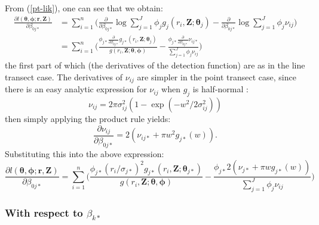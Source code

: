 \documentclass[10pt]{article}
\begin{document}
From (\ref{pt-lik}), one can see that we obtain:
\begin{align*}
\frac{\partial l(\boldsymbol{\theta}, \boldsymbol{\phi}; \mathbf{r},\mathbf{Z})}{\partial \beta_{0j*}}  &= \sum_{i=1}^n \Big( \frac{\partial}{\partial \beta_{0j*}} \log \sum_{j=1}^J \phi_j g_j(r_i,\mathbf{Z}; \boldsymbol{\theta}_j) - \frac{\partial}{\partial \beta_{0j*}}\log \sum_{j=1}^J \phi_j \nu_{ij}\Big)\\
&= \sum_{i=1}^n \Big( \frac{ \phi_{j*} \frac{\partial}{\partial \beta_{0j*}}  g_{j*} (r_i,\mathbf{Z}; \boldsymbol{\theta}_j)}{g(r_i,\mathbf{Z}; \boldsymbol{\theta}, \boldsymbol{\phi})} - \frac{ \phi_{j*}\frac{\partial}{\partial \beta_{0j*}}  \nu_{ij*} }{ \sum_{j=1}^J \phi_j \nu_{ij}}\Big)
\end{align*}
the first part of which (the derivatives of the detection function) are as in the line transect case. The derivatives of $\nu_{ij}$ are simpler in the point transect case, since there is an easy analytic expression for $\nu_{ij}$ when $g_j$ is half-normal :
\begin{equation*}
\nu_{ij} = 2 \pi \sigma_{ij}^2 (1-\exp (-w^2/2\sigma_{ij}^2 ))
\end{equation*}
then simply applying the product rule yields:
\begin{equation*}
\frac{\partial \nu_{ij}}{\partial \beta_{0j*}} = 2 (\nu_{ij*} + \pi w^2 g_{j*}(w)).
\end{equation*}
Substituting this into the above expression:
\begin{equation*}
\frac{\partial l(\boldsymbol{\theta}, \boldsymbol{\phi}; \mathbf{r},\mathbf{Z})}{\partial \beta_{0j*}}  = \sum_{i=1}^n \Big( \frac{ \phi_{j*} (r_i/\sigma_{j*})^2 g_{j*}(r_i,\mathbf{Z}; \boldsymbol{\theta}_{j*})}{g(r_i,\mathbf{Z}; \boldsymbol{\theta}, \boldsymbol{\phi})} - \frac{ \phi_{j*} 2 (\nu_{j*} + \pi w g_{j*}(w)) }{ \sum_{j=1}^J \phi_j \nu_{ij}}\Big)
\end{equation*}

\subsubsection*{With respect to $\beta_{k*}$}
\end{document}
